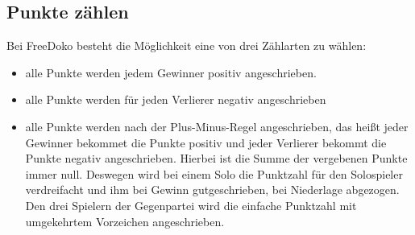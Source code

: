 \documentclass{scrartcl}
\begin{document}
\subsection{Punkte zählen}
Bei FreeDoko besteht \optional die Möglichkeit eine von drei Zählarten zu wählen:
\begin{itemize}
  \item alle Punkte werden jedem Gewinner positiv angeschrieben.
  \item alle Punkte werden für jeden Verlierer negativ angeschrieben
  \item alle Punkte werden nach der Plus-Minus-Regel angeschrieben, das heißt jeder
    Gewinner bekommet die Punkte positiv und jeder Verlierer bekommt die Punkte negativ angeschrieben.  Hierbei ist die Summe der vergebenen Punkte immer null. Deswegen wird bei einem Solo die Punktzahl für den Solospieler verdreifacht und ihm bei Gewinn gutgeschrieben, bei Niederlage abgezogen. Den drei Spielern der Gegenpartei wird die einfache Punktzahl mit umgekehrtem Vorzeichen angeschrieben.
\end{itemize}
\end{document}
